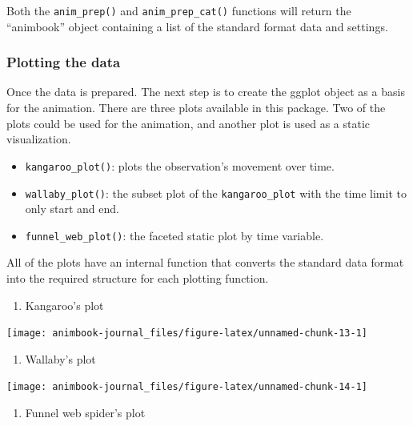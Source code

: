 Both the \texttt{anim\_prep()} and \texttt{anim\_prep\_cat()} functions will return the ``animbook'' object containing a list of the standard format data and settings.

\hypertarget{plotting-the-data}{%
\subsubsection{Plotting the data}\label{plotting-the-data}}

Once the data is prepared. The next step is to create the ggplot object as a basis for the animation. There are three plots available in this package. Two of the plots could be used for the animation, and another plot is used as a static visualization.

\begin{itemize}
\tightlist
\item
  \texttt{kangaroo\_plot()}: plots the observation's movement over time.
\item
  \texttt{wallaby\_plot()}: the subset plot of the \texttt{kangaroo\_plot} with the time limit to only start and end.
\item
  \texttt{funnel\_web\_plot()}: the faceted static plot by time variable.
\end{itemize}

All of the plots have an internal function that converts the standard data format into the required structure for each plotting function.

\begin{enumerate}
\def\labelenumi{\arabic{enumi}.}
\tightlist
\item
  Kangaroo's plot
\end{enumerate}

\texttt{[image: animbook-journal\_files/figure-latex/unnamed-chunk-13-1]}

\begin{enumerate}
\def\labelenumi{\arabic{enumi}.}
\setcounter{enumi}{1}
\tightlist
\item
  Wallaby's plot
\end{enumerate}

\texttt{[image: animbook-journal\_files/figure-latex/unnamed-chunk-14-1]}

\begin{enumerate}
\def\labelenumi{\arabic{enumi}.}
\setcounter{enumi}{2}
\tightlist
\item
  Funnel web spider's plot
\end{enumerate}

